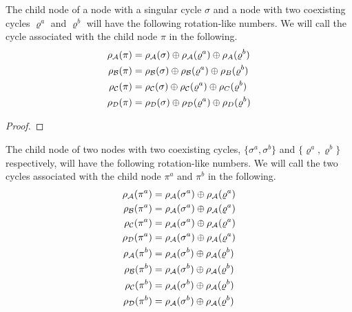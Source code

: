 \begin{theorem}
	The child node of a node with a singular cycle $\sigma$ and a node with two coexisting cycles $\varrho^a$ and $\varrho^b$ will have the following rotation-like numbers.
	We will call the cycle associated with the child node $\pi$ in the following.
	\begin{align*}
		\rho_{\mathcal{A}}(\pi) & =
		\rho_{\mathcal{A}}(\sigma) \oplus \rho_{\mathcal{A}}(\varrho^a) \oplus \rho_A(\varrho^b) \\
		\rho_{\mathcal{B}}(\pi) & =
		\rho_{\mathcal{B}}(\sigma) \oplus \rho_{\mathcal{B}}(\varrho^a) \oplus \rho_B(\varrho^b) \\
		\rho_{\mathcal{C}}(\pi) & =
		\rho_{\mathcal{C}}(\sigma) \oplus \rho_{\mathcal{C}}(\varrho^a) \oplus \rho_C(\varrho^b) \\
		\rho_{\mathcal{D}}(\pi) & =
		\rho_{\mathcal{D}}(\sigma) \oplus \rho_{\mathcal{D}}(\varrho^a) \oplus \rho_D(\varrho^b)
	\end{align*}
\end{theorem}

\begin{proof}
\end{proof}


\begin{theorem}
	The child node of two nodes with two coexisting cycles, $\{\sigma^a, \sigma^b\}$ and $\{\varrho^a, \varrho^b\}$ respectively, will have the following rotation-like numbers.
	We will call the two cycles associated with the child node $\pi^a$ and $\pi^b$ in the following.
	\begin{align*}
		\rho_{\mathcal{A}}(\pi^a) & = \rho_{\mathcal{A}}(\sigma^a) \oplus \rho_{\mathcal{A}}(\varrho^a) \\
		\rho_{\mathcal{B}}(\pi^a) & = \rho_{\mathcal{A}}(\sigma^a) \oplus \rho_{\mathcal{A}}(\varrho^a) \\
		\rho_{\mathcal{C}}(\pi^a) & = \rho_{\mathcal{A}}(\sigma^a) \oplus \rho_{\mathcal{A}}(\varrho^a) \\
		\rho_{\mathcal{D}}(\pi^a) & = \rho_{\mathcal{A}}(\sigma^a) \oplus \rho_{\mathcal{A}}(\varrho^a) \\
		\rho_{\mathcal{A}}(\pi^b) & = \rho_{\mathcal{A}}(\sigma^b) \oplus \rho_{\mathcal{A}}(\varrho^b) \\
		\rho_{\mathcal{B}}(\pi^b) & = \rho_{\mathcal{A}}(\sigma^b) \oplus \rho_{\mathcal{A}}(\varrho^b) \\
		\rho_{\mathcal{C}}(\pi^b) & = \rho_{\mathcal{A}}(\sigma^b) \oplus \rho_{\mathcal{A}}(\varrho^b) \\
		\rho_{\mathcal{D}}(\pi^b) & = \rho_{\mathcal{A}}(\sigma^b) \oplus \rho_{\mathcal{A}}(\varrho^b)
	\end{align*}
\end{theorem}

